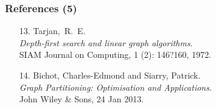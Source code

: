 \documentclass[titlepage,german,presentation]{beamer}
\begin{document}
\begin{frame}
\frametitle{References (5)}

\begin{itemize}

\item[13.]
Tarjan,~R.~E.\\  
{\em Depth-first search and linear graph algorithms}.\\
SIAM Journal on Computing, 1 (2): 146?160, 1972.

\item[14.]
Bichot, Charles-Edmond and Siarry, Patrick.\\
{\em Graph Partitioning: Optimisation and Applications}.\\
John Wiley \& Sons, 24 Jan 2013.
\vfill\clearpage
\end{itemize}

\end{frame}
\end{document}
